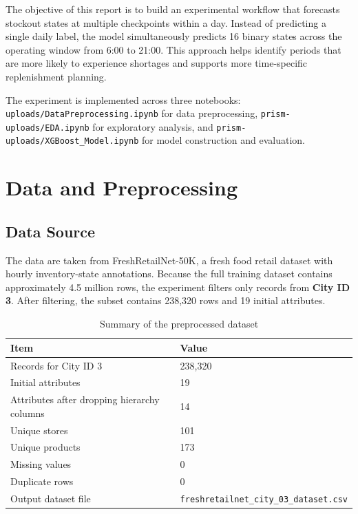 \documentclass{llncs}
\begin{document}
The objective of this report is to build an experimental workflow that forecasts stockout states at multiple checkpoints within a day. Instead of predicting a single daily label, the model simultaneously predicts 16 binary states across the operating window from 6:00 to 21:00. This approach helps identify periods that are more likely to experience shortages and supports more time-specific replenishment planning.

The experiment is implemented across three notebooks: \texttt{uploads/DataPreprocessing.ipynb} for data preprocessing, \texttt{prism-uploads/EDA.ipynb} for exploratory analysis, and \texttt{prism-uploads/XGBoost\_Model.ipynb} for model construction and evaluation.

\section{Data and Preprocessing}

\subsection{Data Source}
The data are taken from FreshRetailNet-50K, a fresh food retail dataset with hourly inventory-state annotations. Because the full training dataset contains approximately 4.5 million rows, the experiment filters only records from \textbf{City ID 3}. After filtering, the subset contains 238,320 rows and 19 initial attributes.

\begin{table}[htbp]
\centering
\caption{Summary of the preprocessed dataset}
\begin{tabular}{ll}
\toprule
\textbf{Item} & \textbf{Value} \\
\midrule
Records for City ID 3 & 238,320 \\
Initial attributes & 19 \\
Attributes after dropping hierarchy columns & 14 \\
Unique stores & 101 \\
Unique products & 173 \\
Missing values & 0 \\
Duplicate rows & 0 \\
Output dataset file & \texttt{freshretailnet\_city\_03\_dataset.csv} \\
\bottomrule
\end{tabular}
\end{table}
\end{document}
